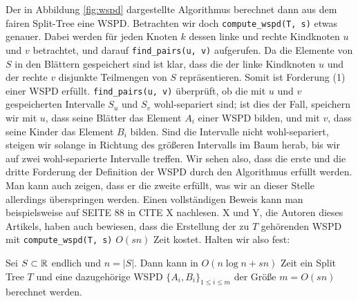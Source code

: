 	Der in Abbildung \ref{fig:wspd} dargestellte Algorithmus berechnet dann aus dem fairen Split-Tree eine WSPD.
	Betrachten wir doch \texttt{compute\_wspd(T, s)} etwas genauer. Dabei werden für jeden Knoten $k$ dessen linke und rechte Kindknoten $u$ und $v$ betrachtet, und darauf \texttt{find\_pairs(u, v)} aufgerufen. Da die Elemente von $S$ in den Blättern gespeichert sind ist klar, dass die der linke Kindknoten $u$ und der rechte $v$ disjunkte Teilmengen von $S$ repräsentieren. Somit ist Forderung (1) einer WSPD erfüllt. \texttt{find\_pairs(u, v)} überprüft, ob die mit $u$ und $v$ gespeicherten Intervalle $S_u$ und $S_v$ wohl-separiert sind; ist dies der Fall, speichern wir mit $u$, dass seine Blätter das Element $A_i$ einer WSPD bilden, und mit $v$, dass seine Kinder das Element $B_i$ bilden. Sind die Intervalle nicht wohl-separiert, steigen wir solange in Richtung des größeren Intervalls im Baum herab, bis wir auf zwei wohl-separierte Intervalle treffen. Wir sehen also, dass die erste und die dritte Forderung der Definition der WSPD durch den Algorithmus erfüllt werden. Man kann auch zeigen, dass er die zweite erfüllt, was wir an dieser Stelle allerdings überspringen werden. Einen vollständigen Beweis kann man beispielsweise auf SEITE 88 in CITE X nachlesen. X und Y, die Autoren dieses Artikels, haben auch bewiesen, dass die Erstellung der zu $T$ gehörenden WSPD mit \texttt{compute\_wspd(T, s)} $O(sn)$ Zeit kostet. Halten wir also fest:
	\begin{theorem}
		\label{theo:wspdtime}
		Sei $S \subset \mathbb{R}$ endlich und $n = |S|$. Dann kann in $O(n \log n + sn)$ Zeit ein Split Tree $T$ und eine dazugehörige WSPD $\{A_i, B_i\}_{1 \leq i \leq m}$ der Größe $m = O(sn)$ berechnet werden.
	\end{theorem}